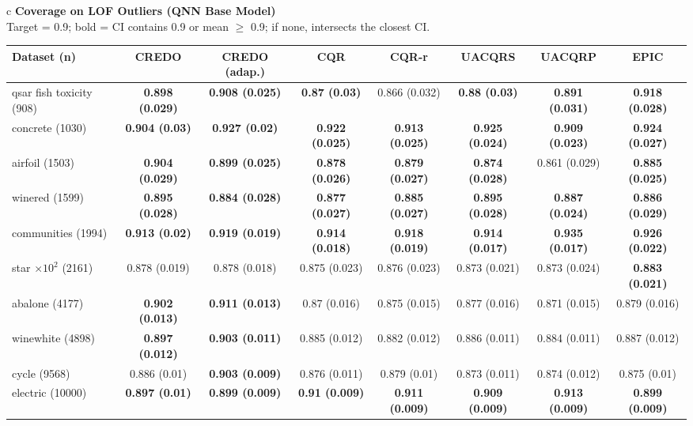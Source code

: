 \documentclass[border=6pt]{standalone}
\begin{document}
\begin{adjustbox}{max width=\linewidth}
\begin{tabular}{c}
{\small\textbf{Coverage on LOF Outliers (QNN Base Model)}}\\[-1pt]
{\scriptsize Target = 0.9; bold = CI contains 0.9 or mean $\geq$ 0.9; if none, intersects the closest CI.}\\[2pt]
\scriptsize\begin{tabular}{lccccccc}
\hline
Dataset (n) & \textbf{CREDO} & \textbf{CREDO (adap.)} & \textbf{CQR} & \textbf{CQR-r} & \textbf{UACQRS} & \textbf{UACQRP} & \textbf{EPIC}\\ \hline
qsar fish toxicity (908) & \textbf{0.898 (0.029)} & \textbf{0.908 (0.025)} & \textbf{0.87 (0.03)} & 0.866 (0.032) & \textbf{0.88 (0.03)} & \textbf{0.891 (0.031)} & \textbf{0.918 (0.028)}\\
concrete (1030) & \textbf{0.904 (0.03)} & \textbf{0.927 (0.02)} & \textbf{0.922 (0.025)} & \textbf{0.913 (0.025)} & \textbf{0.925 (0.024)} & \textbf{0.909 (0.023)} & \textbf{0.924 (0.027)}\\
airfoil (1503) & \textbf{0.904 (0.029)} & \textbf{0.899 (0.025)} & \textbf{0.878 (0.026)} & \textbf{0.879 (0.027)} & \textbf{0.874 (0.028)} & 0.861 (0.029) & \textbf{0.885 (0.025)}\\
winered (1599) & \textbf{0.895 (0.028)} & \textbf{0.884 (0.028)} & \textbf{0.877 (0.027)} & \textbf{0.885 (0.027)} & \textbf{0.895 (0.028)} & \textbf{0.887 (0.024)} & \textbf{0.886 (0.029)}\\
communities (1994) & \textbf{0.913 (0.02)} & \textbf{0.919 (0.019)} & \textbf{0.914 (0.018)} & \textbf{0.918 (0.019)} & \textbf{0.914 (0.017)} & \textbf{0.935 (0.017)} & \textbf{0.926 (0.022)}\\
star $\times 10^2$ (2161) & 0.878 (0.019) & 0.878 (0.018) & 0.875 (0.023) & 0.876 (0.023) & 0.873 (0.021) & 0.873 (0.024) & \textbf{0.883 (0.021)}\\
abalone (4177) & \textbf{0.902 (0.013)} & \textbf{0.911 (0.013)} & 0.87 (0.016) & 0.875 (0.015) & 0.877 (0.016) & 0.871 (0.015) & 0.879 (0.016)\\
winewhite (4898) & \textbf{0.897 (0.012)} & \textbf{0.903 (0.011)} & 0.885 (0.012) & 0.882 (0.012) & 0.886 (0.011) & 0.884 (0.011) & 0.887 (0.012)\\
cycle (9568) & 0.886 (0.01) & \textbf{0.903 (0.009)} & 0.876 (0.011) & 0.879 (0.01) & 0.873 (0.011) & 0.874 (0.012) & 0.875 (0.01)\\
electric (10000) & \textbf{0.897 (0.01)} & \textbf{0.899 (0.009)} & \textbf{0.91 (0.009)} & \textbf{0.911 (0.009)} & \textbf{0.909 (0.009)} & \textbf{0.913 (0.009)} & \textbf{0.899 (0.009)}\\

\end{tabular}
\end{tabular}
\end{adjustbox}
\end{document}
